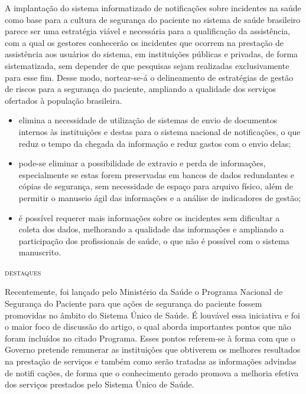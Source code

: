 \documentclass{article}
\begin{document}
A implantação do sistema informatizado de notificações sobre incidentes na saúde
como base
para a cultura de segurança do paciente no sistema de saúde brasileiro parece
ser uma
estratégia viável e necessária para a qualificação da assistência, com a qual os
gestores
conhecerão os incidentes que ocorrem na prestação de assistência aos usuários do
sistema, em
instituições públicas e privadas, de forma sistematizada, sem depender de que
pesquisas
sejam realizadas exclusivamente para esse fim. Desse modo, nortear-se-á o
delineamento de
estratégias de gestão de riscos para a segurança do paciente, ampliando a
qualidade dos
serviços ofertados à população brasileira.

\begin{itemize}
\item
elimina a necessidade de utilização de sistemas de envio de documentos internos
às
instituições e destas para o sistema nacional de notificações, o que reduz o
tempo da
chegada da informação e reduz gastos com o envio delas;

\item
pode-se eliminar a possibilidade de extravio e perda de informações,
especialmente se
estas forem preservadas em bancos de dados redundantes e cópias de segurança,
sem
necessidade de espaço para arquivo físico, além de permitir o manuseio ágil das
informações e a análise de indicadores de gestão;

\item
é possível requerer mais informações sobre os incidentes sem dificultar a coleta
dos
dados, melhorando a qualidade das informações e ampliando a participação dos
profissionais de saúde, o que não é possível com o sistema manuscrito.

\end{itemize}

\textsc{destaques}

Recentemente, foi lançado pelo Ministério da Saúde o Programa Nacional de
Segurança do
Paciente para que ações de segurança do paciente fossem promovidas no âmbito do
Sistema
Único de Saúde. É louvável essa iniciativa e foi o maior foco de discussão do
artigo, o qual
aborda importantes pontos que não foram incluídos no citado Programa. Esses
pontos
referem-se à forma com que o Governo pretende remunerar as instituições que
obtiverem os
melhores resultados na prestação de serviços e também como serão tratadas as
informações
advindas de notifi cações, de forma que o conhecimento gerado promova a melhoria
efetiva dos
serviços prestados pelo Sistema Único de Saúde.
\end{document}
